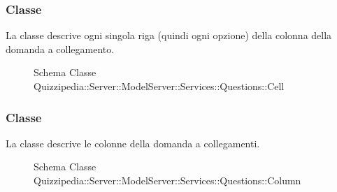 \subsubsection{Classe }
La classe descrive ogni singola riga (quindi ogni opzione) della colonna della domanda a collegamento.
\begin{figure}[H]
\centering
\noindent{}
\caption[Schema Classe Cell]{Schema Classe Quizzipedia::Server::ModelServer::Services::Questions::Cell}
\end{figure}
\subsubsection{Classe }
La classe descrive le colonne della domanda a collegamenti.
\begin{figure}[H]
\centering
\noindent{}
\caption[Schema Classe Column]{Schema Classe Quizzipedia::Server::ModelServer::Services::Questions::Column}
\end{figure}
